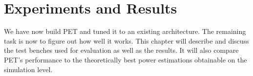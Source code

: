 \chapter{Experiments and Results}

We have now build PET and tuned it to an existing architecture. The remaining
task is now to figure out how well it works. This chapter will describe and
discuss the test benches used for evaluation as well as the results. It will
also compare PET's performance to the theoretically best power estimations
obtainable on the simulation level.




